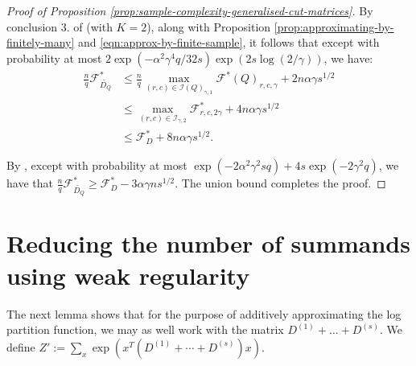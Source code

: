 \documentclass[final, 12pt]{colt2018}
\newcommand{\F}{\mathcal{F}}
\newcommand{\I}{\mathcal{I}}
\theoremstyle{definition}
\theoremstyle{plain}
\begin{document}
\begin{proof}[Proof of Proposition \ref{prop:sample-complexity-generalised-cut-matrices}]
By conclusion $3.$ of  (with $K=2$), along with Proposition \ref{prop:approximating-by-finitely-many} and \cref{eqn:approx-by-finite-sample}, it follows that except with probability at most $2\exp(-\alpha^2\gamma^4q/32s)\exp(2s\log(2/\gamma))$, we have:
\begin{align*}
\frac{n}{q}\F_{\tilde{D_{Q}}}^{*} & \leq\frac{n}{q}\max_{(r,c)\in\I(Q)_{\gamma,1}}\F^*(Q)_{r,c,\gamma}+2n\alpha\gamma s^{1/2}\\
 & \leq\max_{(r,c)\in\I_{\gamma,2}}\F^*_{r,c,2\gamma}+4n\alpha\gamma s^{1/2}\\
 & \leq\F_{D}^{*}+8n\alpha\gamma s^{1/2}.
\end{align*}


By , except with probability at most $ \exp(-2\alpha^{2}\gamma^{2}sq) + 4s\exp(-2\gamma^2q)$, we have that $\frac{n}{q}\F_{\tilde{D_Q}}^{*} \geq \F^{*}_{D} - 3\alpha \gamma n s^{1/2}$. The union bound completes the proof.  
\end{proof}






\iffalse %
\section{Reducing the number of summands using weak regularity}%
The next lemma shows that for the purpose of additively approximating
the log partition function, we may as well work with the matrix $D^{(1)}+\dots+D^{(s)}$. We define $Z' := \sum_x \exp(x^T(D^{(1)} + \cdots + D^{(s)}) x)$. 
\end{document}
